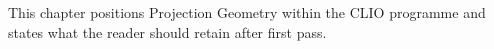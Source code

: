 This chapter positions Projection Geometry within the CLIO programme and states what the reader should retain after first pass.
